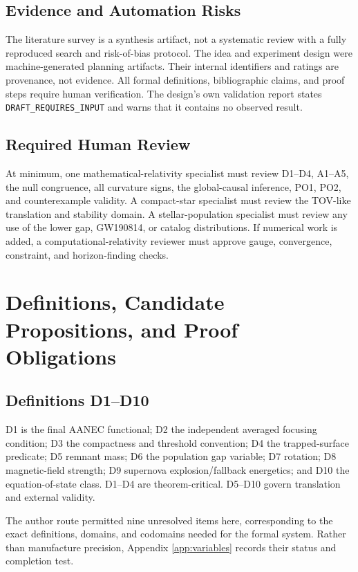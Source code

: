 \documentclass[conference]{IEEEtran}
\begin{document}
\subsection{Evidence and Automation Risks}
The literature survey is a synthesis artifact, not a systematic review with a fully reproduced search and risk-of-bias protocol. The idea and experiment design were machine-generated planning artifacts. Their internal identifiers and ratings are provenance, not evidence. All formal definitions, bibliographic claims, and proof steps require human verification. The design's own validation report states \texttt{DRAFT\_REQUIRES\_INPUT} and warns that it contains no observed result.

\subsection{Required Human Review}
At minimum, one mathematical-relativity specialist must review D1--D4, A1--A5, the null congruence, all curvature signs, the global-causal inference, PO1, PO2, and counterexample validity. A compact-star specialist must review the TOV-like translation and stability domain. A stellar-population specialist must review any use of the lower gap, GW190814, or catalog distributions. If numerical work is added, a computational-relativity reviewer must approve gauge, convergence, constraint, and horizon-finding checks.

\section{Definitions, Candidate Propositions, and Proof Obligations}
\label{sec:definitions}

\subsection{Definitions D1--D10}
D1 is the final AANEC functional; D2 the independent averaged focusing condition; D3 the compactness and threshold convention; D4 the trapped-surface predicate; D5 remnant mass; D6 the population gap variable; D7 rotation; D8 magnetic-field strength; D9 supernova explosion/fallback energetics; and D10 the equation-of-state class. D1--D4 are theorem-critical. D5--D10 govern translation and external validity.

The author route permitted nine unresolved items here, corresponding to the exact definitions, domains, and codomains needed for the formal system. Rather than manufacture precision, Appendix \ref{app:variables} records their status and completion test.
\end{document}
